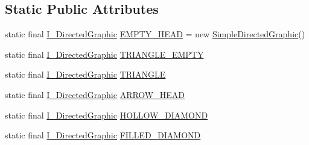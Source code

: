 \subsection*{Static Public Attributes}
\begin{DoxyCompactItemize}
\item 
static final \hyperlink{interfaceorg_1_1tzi_1_1use_1_1gui_1_1views_1_1diagrams_1_1util_1_1_i___directed_graphic}{I\-\_\-\-Directed\-Graphic} \hyperlink{classorg_1_1tzi_1_1use_1_1gui_1_1views_1_1diagrams_1_1util_1_1_directed_graphic_factory_a10eb3d9dcee555801b4b93af32267482}{E\-M\-P\-T\-Y\-\_\-\-H\-E\-A\-D} = new \hyperlink{classorg_1_1tzi_1_1use_1_1gui_1_1views_1_1diagrams_1_1util_1_1_simple_directed_graphic}{Simple\-Directed\-Graphic}()
\item 
static final \hyperlink{interfaceorg_1_1tzi_1_1use_1_1gui_1_1views_1_1diagrams_1_1util_1_1_i___directed_graphic}{I\-\_\-\-Directed\-Graphic} \hyperlink{classorg_1_1tzi_1_1use_1_1gui_1_1views_1_1diagrams_1_1util_1_1_directed_graphic_factory_adce0f23df7d8c62ba8a1a1259d500f2d}{T\-R\-I\-A\-N\-G\-L\-E\-\_\-\-E\-M\-P\-T\-Y}
\item 
static final \hyperlink{interfaceorg_1_1tzi_1_1use_1_1gui_1_1views_1_1diagrams_1_1util_1_1_i___directed_graphic}{I\-\_\-\-Directed\-Graphic} \hyperlink{classorg_1_1tzi_1_1use_1_1gui_1_1views_1_1diagrams_1_1util_1_1_directed_graphic_factory_a228962e57425c1c1b379ba067afca635}{T\-R\-I\-A\-N\-G\-L\-E}
\item 
static final \hyperlink{interfaceorg_1_1tzi_1_1use_1_1gui_1_1views_1_1diagrams_1_1util_1_1_i___directed_graphic}{I\-\_\-\-Directed\-Graphic} \hyperlink{classorg_1_1tzi_1_1use_1_1gui_1_1views_1_1diagrams_1_1util_1_1_directed_graphic_factory_a47a8c200aa70c4ef78dab9ba2d6e0bf3}{A\-R\-R\-O\-W\-\_\-\-H\-E\-A\-D}
\item 
static final \hyperlink{interfaceorg_1_1tzi_1_1use_1_1gui_1_1views_1_1diagrams_1_1util_1_1_i___directed_graphic}{I\-\_\-\-Directed\-Graphic} \hyperlink{classorg_1_1tzi_1_1use_1_1gui_1_1views_1_1diagrams_1_1util_1_1_directed_graphic_factory_a0881f95044b84bd97ccac1b4586fd328}{H\-O\-L\-L\-O\-W\-\_\-\-D\-I\-A\-M\-O\-N\-D}
\item 
static final \hyperlink{interfaceorg_1_1tzi_1_1use_1_1gui_1_1views_1_1diagrams_1_1util_1_1_i___directed_graphic}{I\-\_\-\-Directed\-Graphic} \hyperlink{classorg_1_1tzi_1_1use_1_1gui_1_1views_1_1diagrams_1_1util_1_1_directed_graphic_factory_abd23d1a02d51fb93415cb3b3586ebd5c}{F\-I\-L\-L\-E\-D\-\_\-\-D\-I\-A\-M\-O\-N\-D}
\end{DoxyCompactItemize}


